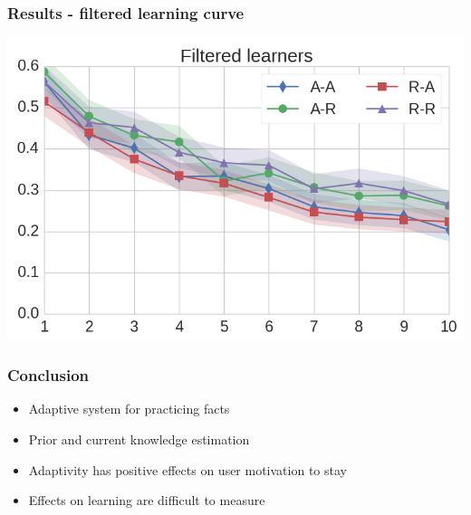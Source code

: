 \documentclass[xcolor=svgnames]{beamer}
\begin{document}
\begin{frame}
	\frametitle{Results - filtered learning curve}
   \includegraphics[width=\textwidth]{img/learning_curves_filtered.png}
\end{frame}
\begin{frame}
	\frametitle{Conclusion}
  \begin{itemize}
    \item Adaptive system for practicing facts
    \item Prior and current knowledge estimation
    \item Adaptivity has positive effects on user motivation to stay
    \item Effects on learning are difficult to measure
    \
  \end{itemize}
\end{frame}
\end{document}
